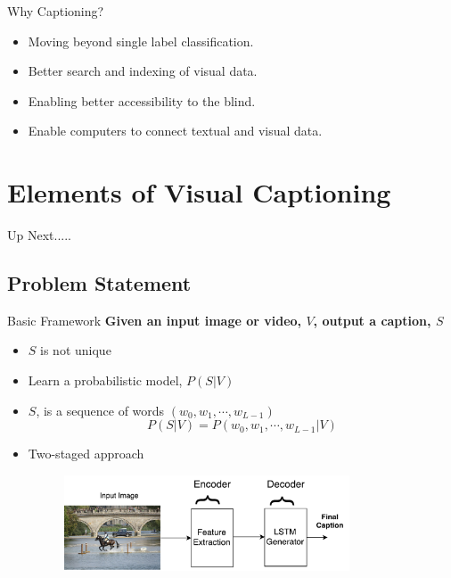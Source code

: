 \documentclass{beamer}
\begin{document}
\begin{frame}{Why Captioning?}
\begin{itemize}
\item Moving beyond single label classification.
\item Better search and indexing of visual data.
\item Enabling better accessibility to the blind.
\item Enable computers to connect textual and visual data. 
\end{itemize}
\end{frame}

\section{Elements of Visual Captioning}
\begin{frame}{Up Next.....}
\tableofcontents[currentsection] 
\end{frame}
\subsection{Problem Statement}
\begin{frame}{Basic Framework}
\textbf{Given an input image or video, $V$, output a caption, $S$}
\begin{itemize}
\item $S$ is not unique
\item Learn a probabilistic model, $P(S|V)$
\item $S$, is a sequence of words $(w_0, w_1,\cdots, w_{L-1})$
\begin{equation}
\label{eq:langB1} P(S|V) = P(w_0, w_1, \cdots, w_{L-1}|V)
\end{equation}
\item Two-staged approach
    {
        \begin{figure}[h]
            \centering
            \includegraphics[width=0.8\textwidth]{images/EncDec.pdf}
        \end{figure}
     }
\end{itemize} 
\end{frame}
\end{document}
